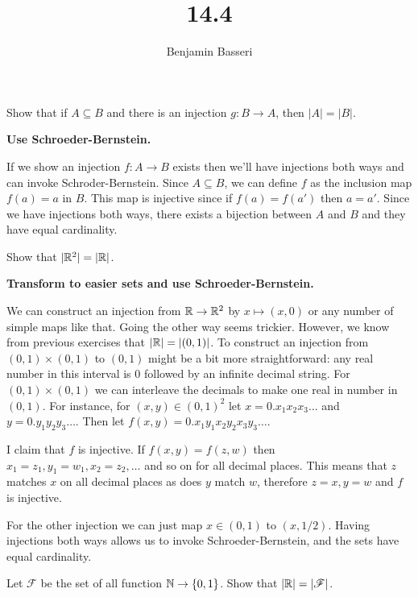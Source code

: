 \documentclass{article}
\title{14.4}
\author{Benjamin Basseri}
\begin{document}
\maketitle

\begin{problem}
Show that if $A \subseteq B$ and there is an injection $g: B \to A$, then $|A| = |B|$.
\end{problem}

\textbf{Use Schroeder-Bernstein.}

If we show an injection $f: A \to B$ exists then we'll have injections both ways and can invoke Schroder-Bernstein. Since $A \subseteq B$, we can define $f$ as the inclusion map $f(a) = a$ in $B$. This map is injective since if $f(a) = f(a')$ then $a = a'$. Since we have injections both ways, there exists a bijection between $A$ and $B$ and they have equal cardinality.

\begin{problem}
Show that $|\mathbb{R}^2| = |\mathbb{R}|$.
\end{problem}

\textbf{Transform to easier sets and use Schroeder-Bernstein.}

We can construct an injection from $\mathbb{R} \to \mathbb{R}^2$ by $x \mapsto (x, 0)$ or any number of simple maps like that. Going the other way seems trickier. However, we know from previous exercises that $|\mathbb{R}| = |(0, 1)|$. To construct an injection from $(0, 1) \times (0, 1)$ to $(0, 1)$ might be a bit more straightforward: any real number in this interval is 0 followed by an infinite decimal string. For $(0, 1) \times (0, 1)$ we can interleave the decimals to make one real in number in $(0, 1)$. For instance, for $(x, y) \in (0, 1)^2$ let $x = 0.x_1 x_2 x_3 \ldots$ and $y = 0.y_1 y_2 y_3 \ldots$. Then let $f(x, y) = 0.x_1 y_1 x_2 y_2 x_3 y_3 \ldots$.

I claim that $f$ is injective. If $f(x, y) = f(z, w)$ then $x_1 = z_1, y_1 = w_1, x_2 = z_2, \ldots$ and so on for all decimal places. This means that $z$ matches $x$ on all decimal places as does $y$ match $w$, therefore $z = x, y = w$ and $f$ is injective.

For the other injection we can just map $x \in (0, 1)$ to $(x, 1/2)$. Having injections both ways allows us to invoke Schroeder-Bernstein, and the sets have equal cardinality.

\begin{problem}
Let $\mathscr{F}$ be the set of all function $\mathbb{N} \to \{0, 1\}$. Show that $|\mathbb{R}| = |\mathscr{F}|$.
\end{problem}
\end{document}
